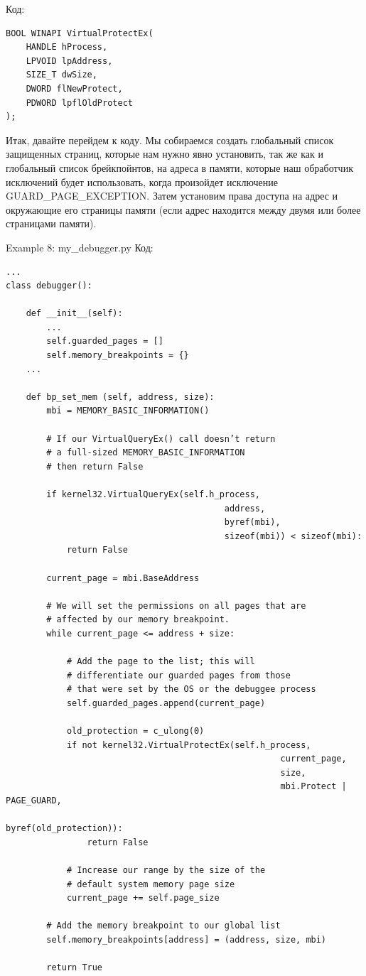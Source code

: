 \documentclass[12pt]{book}
\begin{document}
Код:
\begin{lstlisting}
BOOL WINAPI VirtualProtectEx(
    HANDLE hProcess,
    LPVOID lpAddress,
    SIZE_T dwSize,
    DWORD flNewProtect,
    PDWORD lpflOldProtect
);
\end{lstlisting}

Итак, давайте перейдем к коду. Мы собираемся создать глобальный список защищенных страниц, которые нам нужно явно установить, так же как и глобальный список брейкпойнтов, на адреса в памяти, которые наш обработчик исключений будет использовать, когда произойдет исключение GUARD\_PAGE\_EXCEPTION. Затем установим права доступа на адрес и окружающие его страницы памяти (если адрес находится между двумя или более страницами памяти).

Example 8: my\_debugger.py
Код:
\begin{lstlisting}
...
class debugger():

    def __init__(self):
        ...
        self.guarded_pages = []
        self.memory_breakpoints = {}
    ...

    def bp_set_mem (self, address, size):
        mbi = MEMORY_BASIC_INFORMATION()

        # If our VirtualQueryEx() call doesn’t return
        # a full-sized MEMORY_BASIC_INFORMATION
        # then return False

        if kernel32.VirtualQueryEx(self.h_process,
                                           address,
                                           byref(mbi),
                                           sizeof(mbi)) < sizeof(mbi):
            return False

        current_page = mbi.BaseAddress

        # We will set the permissions on all pages that are
        # affected by our memory breakpoint.
        while current_page <= address + size:

            # Add the page to the list; this will
            # differentiate our guarded pages from those
            # that were set by the OS or the debuggee process
            self.guarded_pages.append(current_page)

            old_protection = c_ulong(0)
            if not kernel32.VirtualProtectEx(self.h_process,
                                                      current_page,
                                                      size,
                                                      mbi.Protect | PAGE_GUARD,
                                                      byref(old_protection)):
                return False

            # Increase our range by the size of the
            # default system memory page size
            current_page += self.page_size

        # Add the memory breakpoint to our global list
        self.memory_breakpoints[address] = (address, size, mbi)

        return True
\end{lstlisting}
\end{document}
